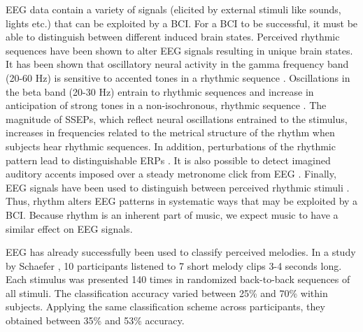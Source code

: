 EEG data contain a variety of signals (elicited by external stimuli like sounds, lights etc.) that can be exploited by a \ac{BCI}. 
For a \ac{BCI} to be successful, it must be able to distinguish between different induced brain states. 
Perceived rhythmic sequences have been shown to alter \ac{EEG} signals resulting in unique brain states.
It has been shown that oscillatory neural activity in the gamma frequency band (20-60 Hz) is sensitive to accented tones in a rhythmic sequence \cite{snyder_gamma-band_2005}.
Oscillations in the beta band (20-30 Hz) entrain to rhythmic sequences \cite{cirelli_beta_2014, merchant_beta_2015} and increase in anticipation of strong tones in a non-isochronous, rhythmic sequence \cite{iversen_top-down_2009,fujioka_beta_2009,fujioka_internalized_2012}.
The magnitude of \acp{SSEP}, which reflect neural oscillations entrained to the stimulus, increases in frequencies related to the metrical structure of the rhythm when subjects hear rhythmic sequences.
In addition, perturbations of the rhythmic pattern lead to distinguishable \acp{ERP} \cite{geiser_early_2009, vlek_shared_2011}.
It is also possible to detect imagined auditory accents imposed over a steady metronome click from EEG \cite{nozaradan_tagging_2011}.
Finally, \ac{EEG} signals have been used to distinguish between perceived rhythmic stimuli \cite{stober2014nips}.
Thus, rhythm alters \ac{EEG} patterns in systematic ways that may be exploited by a \ac{BCI}. 
Because rhythm is an inherent part of music, we expect music to have a similar effect on \ac{EEG} signals. 

EEG has already successfully been used to classify perceived melodies. 
In a study by Schaefer \etal \citeyear{schaefer_name_2011}, 10 participants listened to 7 short melody clips 3-4 seconds long.
Each stimulus was presented 140 times in randomized back-to-back sequences of all stimuli.
The classification accuracy varied between 25\% and 70\% within subjects.
Applying the same classification scheme across participants, they obtained between 35\% and 53\% accuracy.

